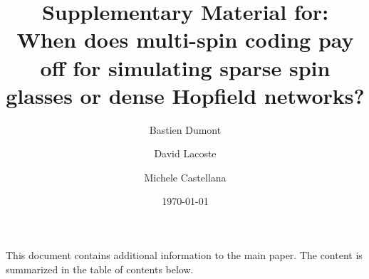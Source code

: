 \documentclass[%
 superscriptaddress,
 amsmath,amssymb,
 aps,
 pra,                      %
 floatfix,
]{revtex4-2}
\begin{document}
\linenumbers

\title{Supplementary Material for:\\When does multi-spin coding pay off for simulating sparse spin glasses or dense Hopfield networks?}

\author{Bastien Dumont}

\author{David Lacoste}

\author{Michele Castellana}

\date{\today}

\maketitle
This document contains additional information to the main paper. The content is summarized in the table of contents below.

\tableofcontents

\FloatBarrier

\FloatBarrier

\FloatBarrier

\FloatBarrier


\end{document}
